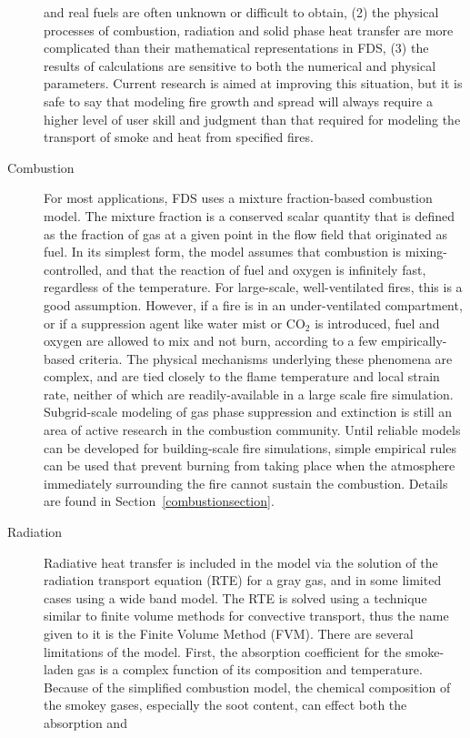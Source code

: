 \documentclass[11pt]{book}
\begin{document}
\begin{description}
and real fuels are often unknown or difficult to obtain, (2) the physical processes of combustion,
radiation and solid phase heat transfer are more complicated than their mathematical representations
in FDS, (3) the results of calculations are sensitive to both the numerical and physical parameters.
Current research is aimed at improving this situation, but it is safe to say that
modeling fire growth and spread will always require a higher level of
user skill and judgment than that required for modeling the transport of smoke and heat from specified fires.
\item[Combustion]
For most applications, FDS uses a mixture fraction-based combustion model.
The mixture fraction is a conserved scalar quantity that is defined as the
fraction of gas at a given point in the flow field that originated as fuel.
In its simplest form, the model assumes that combustion is mixing-controlled, and that the
reaction of fuel and oxygen is infinitely fast, regardless of the temperature.
For large-scale, well-ventilated
fires, this is a good assumption. However, if a fire is in an
under-ventilated compartment, or if a suppression agent like water
mist or CO$_2$ is introduced, fuel and oxygen are allowed to mix and not burn, according to a few empirically-based criteria.
The physical mechanisms underlying these phenomena are complex, and are tied closely to the flame temperature and local strain rate, neither of
which are readily-available in a large scale fire simulation.
Subgrid-scale modeling of gas phase suppression and
extinction is still an area of active research in the combustion
community. Until reliable models can be developed for building-scale
fire simulations, simple empirical rules can be used that
prevent burning from taking place when the atmosphere immediately
surrounding the fire cannot sustain the combustion. Details are found in
Section~\ref{combustionsection}.
\item[Radiation] Radiative heat transfer is included in the model via
the solution of the radiation transport equation (RTE) for a gray gas, and
in some limited cases using a wide band model.  The RTE is solved
using a technique similar to finite volume methods for convective
transport, thus the name given to it is the Finite Volume Method
(FVM). There are several limitations of the model. First, the
absorption coefficient for the smoke-laden gas is a complex function
of its composition and temperature. Because of the simplified
combustion model, the chemical composition of the smokey gases,
especially the soot content, can effect both the absorption and

\end{description}
\end{document}
